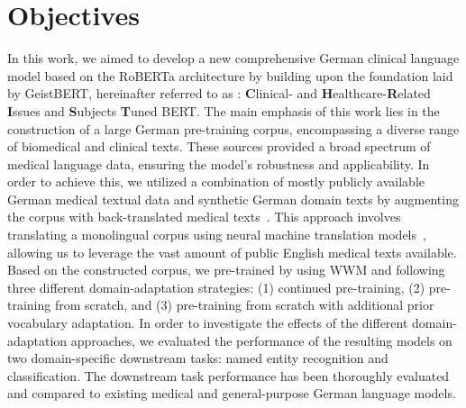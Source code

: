 \section*{Objectives}
In this work, we aimed to develop a new comprehensive German clinical language
model based on the RoBERTa architecture by building upon the foundation laid by
GeistBERT, hereinafter referred to as \textit{\ChristBERT}: \textbf{C}linical-
and \textbf{H}ealthcare-\textbf{R}elated \textbf{I}ssues and \textbf{S}ubjects
\textbf{T}uned BERT. The main emphasis of this work lies in the construction of
a large German pre-training corpus, encompassing a diverse range of biomedical
and clinical texts. These sources provided a broad spectrum of medical
language data, ensuring the model’s robustness and applicability. In order to
achieve this, we utilized a combination of mostly publicly available German
medical textual data and synthetic German domain texts by augmenting the corpus
with back-translated medical texts~\cite{edunov2018understanding}. This approach
involves translating a monolingual corpus using neural machine translation
models~\cite{ng2019facebook, costa2022no}, allowing us to leverage the vast
amount of public English medical texts available. Based on the constructed
corpus, we pre-trained \ChristBERT{} by using WWM and following three
different domain-adaptation strategies: (1) continued pre-training, (2)
pre-training from scratch, and (3) pre-training from scratch with additional
prior vocabulary adaptation. In order to investigate the effects of the
different domain-adaptation approaches, we evaluated the performance of the
resulting models on two domain-specific downstream tasks: named entity
recognition and classification. The downstream task performance has been
thoroughly evaluated and compared to existing medical and general-purpose German
language models.

